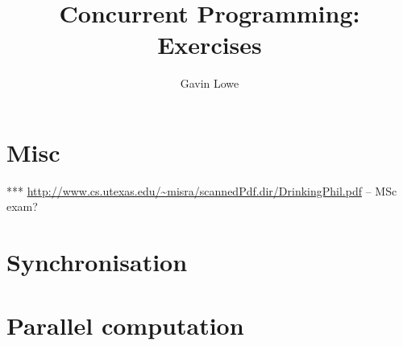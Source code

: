 \documentclass[fleqn,12pt]{article}
\title{Concurrent Programming: Exercises}
\author{Gavin Lowe}
\begin{document}
\maketitle

\section{Misc}




 ***
\url{http://www.cs.utexas.edu/~misra/scannedPdf.dir/DrinkingPhil.pdf} -- MSc
exam? 



\section{Synchronisation}





\section{Parallel computation}




\end{document}
